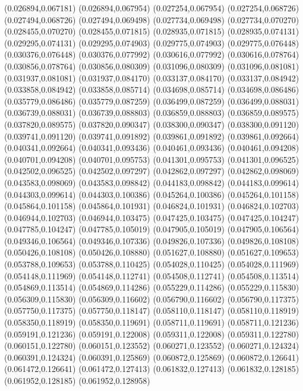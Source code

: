 (0.026894,0.067181)
(0.026894,0.067954)
(0.027254,0.067954)
(0.027254,0.068726)
(0.027494,0.068726)
(0.027494,0.069498)
(0.027734,0.069498)
(0.027734,0.070270)
(0.028455,0.070270)
(0.028455,0.071815)
(0.028935,0.071815)
(0.028935,0.074131)
(0.029295,0.074131)
(0.029295,0.074903)
(0.029775,0.074903)
(0.029775,0.076448)
(0.030376,0.076448)
(0.030376,0.077992)
(0.030616,0.077992)
(0.030616,0.078764)
(0.030856,0.078764)
(0.030856,0.080309)
(0.031096,0.080309)
(0.031096,0.081081)
(0.031937,0.081081)
(0.031937,0.084170)
(0.033137,0.084170)
(0.033137,0.084942)
(0.033858,0.084942)
(0.033858,0.085714)
(0.034698,0.085714)
(0.034698,0.086486)
(0.035779,0.086486)
(0.035779,0.087259)
(0.036499,0.087259)
(0.036499,0.088031)
(0.036739,0.088031)
(0.036739,0.088803)
(0.036859,0.088803)
(0.036859,0.089575)
(0.037820,0.089575)
(0.037820,0.090347)
(0.038300,0.090347)
(0.038300,0.091120)
(0.039741,0.091120)
(0.039741,0.091892)
(0.039861,0.091892)
(0.039861,0.092664)
(0.040341,0.092664)
(0.040341,0.093436)
(0.040461,0.093436)
(0.040461,0.094208)
(0.040701,0.094208)
(0.040701,0.095753)
(0.041301,0.095753)
(0.041301,0.096525)
(0.042502,0.096525)
(0.042502,0.097297)
(0.042862,0.097297)
(0.042862,0.098069)
(0.043583,0.098069)
(0.043583,0.098842)
(0.044183,0.098842)
(0.044183,0.099614)
(0.044303,0.099614)
(0.044303,0.100386)
(0.045264,0.100386)
(0.045264,0.101158)
(0.045864,0.101158)
(0.045864,0.101931)
(0.046824,0.101931)
(0.046824,0.102703)
(0.046944,0.102703)
(0.046944,0.103475)
(0.047425,0.103475)
(0.047425,0.104247)
(0.047785,0.104247)
(0.047785,0.105019)
(0.047905,0.105019)
(0.047905,0.106564)
(0.049346,0.106564)
(0.049346,0.107336)
(0.049826,0.107336)
(0.049826,0.108108)
(0.050426,0.108108)
(0.050426,0.108880)
(0.051627,0.108880)
(0.051627,0.109653)
(0.053788,0.109653)
(0.053788,0.110425)
(0.054028,0.110425)
(0.054028,0.111969)
(0.054148,0.111969)
(0.054148,0.112741)
(0.054508,0.112741)
(0.054508,0.113514)
(0.054869,0.113514)
(0.054869,0.114286)
(0.055229,0.114286)
(0.055229,0.115830)
(0.056309,0.115830)
(0.056309,0.116602)
(0.056790,0.116602)
(0.056790,0.117375)
(0.057750,0.117375)
(0.057750,0.118147)
(0.058110,0.118147)
(0.058110,0.118919)
(0.058350,0.118919)
(0.058350,0.119691)
(0.058711,0.119691)
(0.058711,0.121236)
(0.059191,0.121236)
(0.059191,0.122008)
(0.059311,0.122008)
(0.059311,0.122780)
(0.060151,0.122780)
(0.060151,0.123552)
(0.060271,0.123552)
(0.060271,0.124324)
(0.060391,0.124324)
(0.060391,0.125869)
(0.060872,0.125869)
(0.060872,0.126641)
(0.061472,0.126641)
(0.061472,0.127413)
(0.061832,0.127413)
(0.061832,0.128185)
(0.061952,0.128185)
(0.061952,0.128958)
